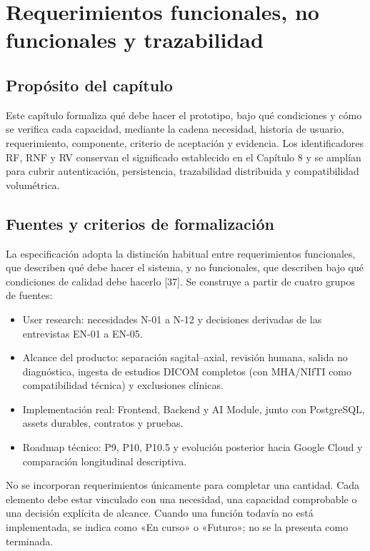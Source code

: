 \chapter{Requerimientos funcionales, no funcionales y trazabilidad}
\label{chap:requerimientos}

\section{Propósito del capítulo}

Este capítulo formaliza qué debe hacer el prototipo, bajo qué condiciones y cómo se verifica cada capacidad, mediante la cadena necesidad, historia de usuario, requerimiento, componente, criterio de aceptación y evidencia. Los identificadores RF, RNF y RV conservan el significado establecido en el Capítulo 8 y se amplían para cubrir autenticación, persistencia, trazabilidad distribuida y compatibilidad volumétrica.

\section{Fuentes y criterios de formalización}

La especificación adopta la distinción habitual entre requerimientos funcionales, que describen qué debe hacer el sistema, y no funcionales, que describen bajo qué condiciones de calidad debe hacerlo [37]. Se construye a partir de cuatro grupos de fuentes:

\begin{itemize}
  \item User research: necesidades N-01 a N-12 y decisiones derivadas de las entrevistas EN-01 a EN-05.
  \item Alcance del producto: separación sagital–axial, revisión humana, salida no diagnóstica, ingesta de estudios DICOM completos (con MHA/NIfTI como compatibilidad técnica) y exclusiones clínicas.
  \item Implementación real: Frontend, Backend y AI Module, junto con PostgreSQL, assets durables, contratos y pruebas.
  \item Roadmap técnico: P9, P10, P10.5 y evolución posterior hacia Google Cloud y comparación longitudinal descriptiva.
\end{itemize}

No se incorporan requerimientos únicamente para completar una cantidad. Cada elemento debe estar vinculado con una necesidad, una capacidad comprobable o una decisión explícita de alcance. Cuando una función todavía no está implementada, se indica como «En curso» o «Futuro»; no se la presenta como terminada.

